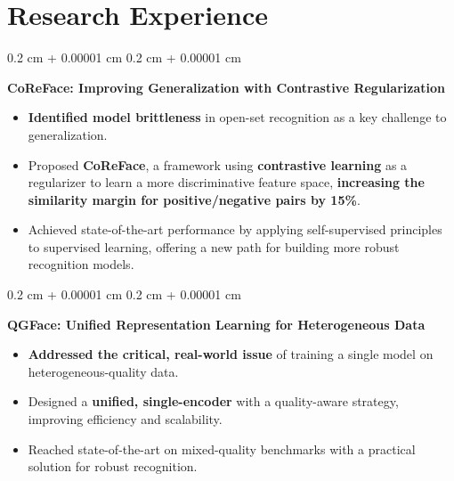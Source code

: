 \documentclass[10pt, letterpaper]{article}
\newenvironment{highlights}{
    \begin{itemize}[
        topsep=0.05 cm,
        parsep=0.05 cm,
        partopsep=0pt,
        itemsep=0pt,
        leftmargin=0.4 cm + 10pt
    ]
}{
    \end{itemize}
} %
\newenvironment{onecolentry}{
    \begin{adjustwidth}{
        0.2 cm + 0.00001 cm
    }{
        0.2 cm + 0.00001 cm
    }
}{
    \end{adjustwidth}
} %
\begin{document}
    \section{Research Experience}
        \begin{onecolentry}
            \textbf{CoReFace: Improving Generalization with Contrastive Regularization}
            \begin{highlights}
                \item \textbf{Identified model brittleness} in open-set recognition as a key challenge to generalization.
                \item Proposed \textbf{CoReFace}, a framework using \textbf{contrastive learning} as a regularizer to learn a more discriminative feature space, \textbf{increasing the similarity margin for positive/negative pairs by 15\%}.
                \item Achieved state-of-the-art performance by applying self-supervised principles to supervised learning, offering a new path for building more robust recognition models.
            \end{highlights}
        \end{onecolentry}

        \begin{onecolentry}
            \textbf{QGFace: Unified Representation Learning for Heterogeneous Data}
            \begin{highlights}
                \item \textbf{Addressed the critical, real-world issue} of training a single model on heterogeneous-quality data.
                \item Designed a \textbf{unified, single-encoder} with a quality-aware strategy, improving efficiency and scalability.
                \item Reached state-of-the-art on mixed-quality benchmarks with a practical solution for robust recognition.
            \end{highlights}
        \end{onecolentry}

\end{document}
